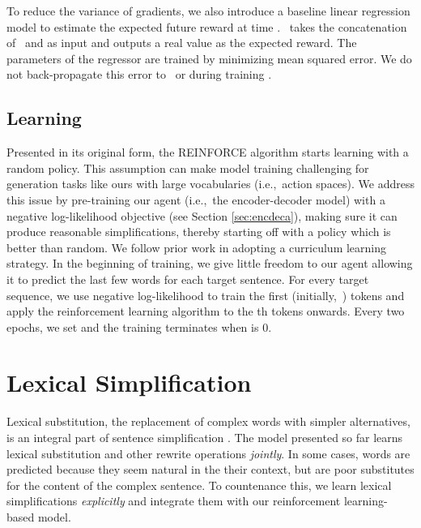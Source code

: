 \documentclass[11pt,letterpaper]{article}
\begin{document}
To reduce the variance of gradients, we also introduce a baseline
linear regression model  to estimate the expected future reward
at time  \cite{ranzato2016sequence}. ~takes the concatenation
of~ and  as input and outputs a real
value as the expected reward. The parameters of the regressor are
trained by minimizing mean squared error. We do not back-propagate
this error to~ or  during training
\cite{ranzato2016sequence}.


\subsection{Learning}
\label{sec:learning}
Presented in its original form, the REINFORCE algorithm starts
learning with a random policy. This assumption can make model training
challenging for generation tasks like ours with large vocabularies
(i.e.,~action spaces). We address this issue by pre-training our agent
(i.e.,~the encoder-decoder model) with a negative log-likelihood
objective (see Section \ref{sec:encdeca}), making sure it can produce
reasonable simplifications, thereby starting off with a policy which
is better than random. We follow prior work \cite{ranzato2016sequence}
in adopting a curriculum learning strategy. In the beginning of
training, we give little freedom to our agent allowing it to predict
the last few words for each target sentence. For every target sequence, we
use negative log-likelihood to train the first  (initially,~)
tokens and apply the reinforcement learning algorithm to the th
tokens onwards. Every two epochs, we set \mbox{} and the
training terminates when  is 0.



\section{Lexical Simplification}
\label{sec:ltm}
Lexical substitution, the replacement of complex words with simpler
alternatives, is an integral part of sentence simplification
\cite{specia-jauhar-mihalcea:2012:STARSEM-SEMEVAL}.
The model presented so far learns lexical substitution and other
rewrite operations \emph{jointly}. In some cases, words are predicted because
they seem natural in the their context, but are poor substitutes for
the content of the complex sentence. To countenance this, we learn
lexical simplifications \emph{explicitly} and integrate them with our
reinforcement learning-based model.
\end{document}
